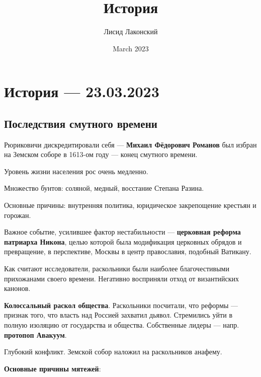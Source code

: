 \documentclass{article}
\title{История}
\author{Лисид Лаконский}
\date{March 2023}
\begin{document}
\raggedright

\maketitle
\tableofcontents
\pagebreak

\section{История — 23.03.2023}

\subsection{Последствия смутного времени}

\begin{multienumerate}
\end{multienumerate}

Рюриковичи дискредитировали себя — \textbf{Михаил Фёдорович Романов} был избран на Земском соборе в 1613-ом году — конец смутного времени.

Уровень жизни населения рос очень медленно.

Множество бунтов: соляной, медный, восстание Степана Разина.

Основные причины: внутренняя политика, юридическое закрепощение крестьян и горожан.

\hfill

Важное событие, усилившее фактор нестабильности — \textbf{церковная реформа патриарха Никона}, целью которой была модификация церковных обрядов и превращение, в перспективе, Москвы в центр православия, подобный Ватикану.

Как считают исследователи, раскольники были наиболее благочестивыми прихожанами своего времени. Негативно восприняли отход от византийских канонов.

\textbf{Колоссальный раскол общества}. Раскольники посчитали, что реформы — признак того, что власть над Россией захватил дьявол. Стремились уйти в полную изоляцию от государства и общества. Собственные лидеры — напр. \textbf{протопоп Авакуум}.

Глубокий конфликт. Земской собор наложил на раскольников анафему.

\hfill

\textbf{Основные причины мятежей}:

\begin{multienumerate}
\end{multienumerate}
\end{document}
